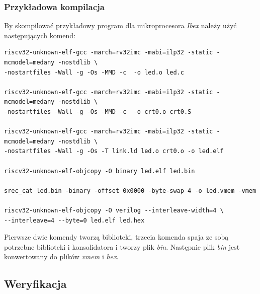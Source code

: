 \documentclass[11pt,a4paper]{article}
\begin{document}
		\subsubsection{Przykładowa kompilacja}
		\hspace{5mm}
			By skompilować przykładowy program dla mikroprocesora 
			\textit{Ibex} należy użyć następujących komend: \\
\begin{minipage}{\textwidth}
\begin{scriptsize}
\begin{lstlisting}[label=Lis:kompilacja,caption=Przykładowa kompilacja]
riscv32-unknown-elf-gcc -march=rv32imc -mabi=ilp32 -static -mcmodel=medany -nostdlib \
-nostartfiles -Wall -g -Os -MMD -c  -o led.o led.c

riscv32-unknown-elf-gcc -march=rv32imc -mabi=ilp32 -static -mcmodel=medany -nostdlib \
-nostartfiles -Wall -g -Os -MMD -c  -o crt0.o crt0.S

riscv32-unknown-elf-gcc -march=rv32imc -mabi=ilp32 -static -mcmodel=medany -nostdlib \
-nostartfiles -Wall -g -Os -T link.ld led.o crt0.o -o led.elf 

riscv32-unknown-elf-objcopy -O binary led.elf led.bin

srec_cat led.bin -binary -offset 0x0000 -byte-swap 4 -o led.vmem -vmem

riscv32-unknown-elf-objcopy -O verilog --interleave-width=4 \
--interleave=4 --byte=0 led.elf led.hex
\end{lstlisting}
\end{scriptsize}
\end{minipage}
Pierwsze dwie komendy tworzą biblioteki, trzecia komenda spaja ze sobą potrzebne biblioteki i konsolidatora i tworzy plik \textit{bin}. Następnie plik \textit{bin} jest konwertowany do plików \textit{vmem} i \textit{hex}.
	\subsection{Weryfikacja}
\end{document}
